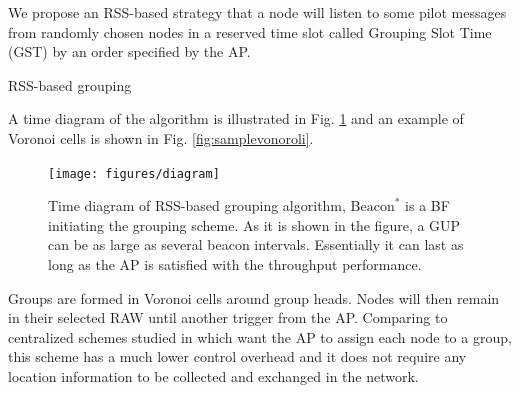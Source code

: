 We propose an RSS-based strategy that a node will listen to some pilot messages from randomly chosen nodes in a reserved time slot called Grouping Slot Time (GST) by an order specified by the AP.

\begin{algorithm} [H]
\caption{RSS-based grouping}
\end{algorithm}

A time diagram of the algorithm is illustrated in Fig. \ref{fig:diagram} and an example of Voronoi cells is shown in Fig. \ref{fig:samplevonoroli}.


\begin{figure} [th]
  \centering
  \texttt{[image: figures/diagram]}
  \caption{Time diagram of RSS-based grouping algorithm, $\text{Beacon}^{\ast}$ is a BF initiating the grouping scheme. As it is shown in the figure, a GUP can be as large as several beacon intervals. Essentially it can last as long as the AP is satisfied with the throughput performance.}
  \label{fig:diagram}
\end{figure}



Groups are formed in Voronoi cells around group heads. Nodes will then remain in their selected RAW until another trigger from the AP.
Comparing to centralized schemes studied in \cite{zheng2014performance} which want the AP to assign each node to a group, this scheme has a much lower control overhead and it does not require any location information to be collected and exchanged in the network.%

